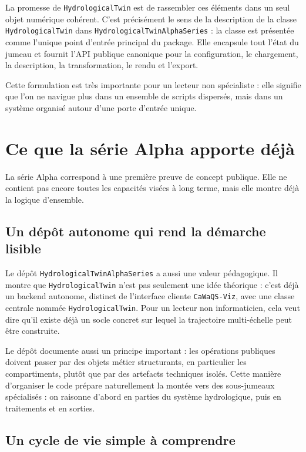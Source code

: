 \documentclass[11pt,a4paper]{article}
\newcommand{\hydrot}{\texttt{HydrologicalTwin}}
\newcommand{\alphaht}{\texttt{HydrologicalTwinAlphaSeries}}
\newcommand{\cwv}{\texttt{CaWaQS-Viz}}
\begin{document}
La promesse de \hydrot{} est de rassembler ces éléments dans un seul objet numérique cohérent. C'est précisément le sens de la description de la classe \texttt{HydrologicalTwin} dans \alphaht{} : la classe est présentée comme \og l'unique point d'entrée principal \fg{} du package. Elle encapsule tout l'état du jumeau et fournit l'API publique canonique pour la configuration, le chargement, la description, la transformation, le rendu et l'export.

Cette formulation est très importante pour un lecteur non spécialiste : elle signifie que l'on ne navigue plus dans un ensemble de scripts dispersés, mais dans un système organisé autour d'une porte d'entrée unique.

\section{Ce que la série Alpha apporte déjà}

La série Alpha correspond à une première preuve de concept publique. Elle ne contient pas encore toutes les capacités visées à long terme, mais elle montre déjà la logique d'ensemble.

\subsection{Un dépôt autonome qui rend la démarche lisible}

Le dépôt \alphaht{} a aussi une valeur pédagogique. Il montre que \hydrot{} n'est pas seulement une idée théorique : c'est déjà un backend autonome, distinct de l'interface cliente \cwv{}, avec une classe centrale nommée \texttt{HydrologicalTwin}. Pour un lecteur non informaticien, cela veut dire qu'il existe déjà un socle concret sur lequel la trajectoire multi-échelle peut être construite.

Le dépôt documente aussi un principe important : les opérations publiques doivent passer par des objets métier structurants, en particulier les compartiments, plutôt que par des artefacts techniques isolés. Cette manière d'organiser le code prépare naturellement la montée vers des sous-jumeaux spécialisés : on raisonne d'abord en parties du système hydrologique, puis en traitements et en sorties.

\subsection{Un cycle de vie simple à comprendre}
\end{document}
